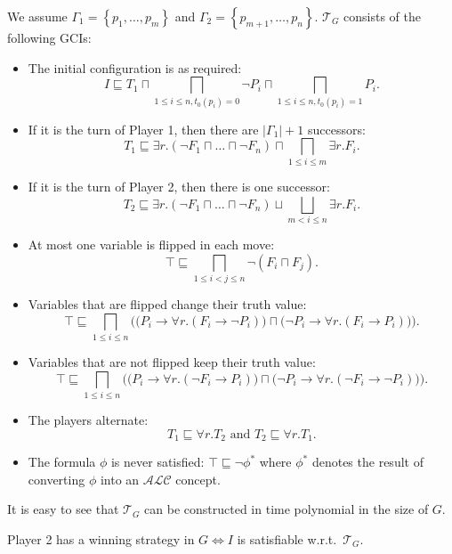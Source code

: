 We assume $\Gamma_1 = \left\{ p_1, \ldots, p_m \right\}$ and $\Gamma_2 = \left\{ p_{m+1}, \ldots, p_n \right\}$.
$\mathcal{T}_G$ consists of the following GCIs:
\begin{itemize}
	\item The initial configuration is as required:
		\[
			I \sqsubseteq T_1 \sqcap \bigsqcap_{1 \leq i \leq n ,t_0(p_i) = 0} \neg P_i \sqcap \bigsqcap_{1 \leq i \leq n, t_0(p_i) = 1} P_i
		.\]
	\item If it is the turn of Player 1, then there are $\lvert \Gamma_1 \rvert + 1$ successors:
		\[
			T_1 \sqsubseteq \exists r.(\neg F_1 \sqcap \ldots \sqcap \neg F_n) \sqcap \bigsqcap_{1 \leq i \leq m} \exists r.F_i
		.\]
	\item If it is the turn of Player 2, then there is one successor:
		\[
			T_2 \sqsubseteq \exists r.(\neg F_1 \sqcap \ldots \sqcap \neg F_n) \sqcup \bigsqcup_{m < i \leq n} \exists r.F_i
		.\]
	\item At most one variable is flipped in each move:
		\[
			\top \sqsubseteq \bigsqcap_{1 \leq i < j \leq n} \neg (F_i \sqcap F_j)
		.\]
	\item Variables that are flipped change their truth value:
		\[
			\top \sqsubseteq \bigsqcap_{1 \leq i \leq n} \bigg( \big( P_i \to \forall r.(F_i \to \neg P_i) \big) \sqcap \big( \neg P_i \to \forall r.(F_i \to P_i) \big) \bigg)
		.\]
	\item Variables that are not flipped keep their truth value:
		\[
			\top \sqsubseteq \bigsqcap_{1 \leq i \leq n} \bigg( \big( P_i \to \forall r.( \neg F_i \to P_i) \big) \sqcap \big( \neg P_i \to \forall r.(\neg F_i \to \neg P_i) \big) \bigg)
		.\]
		\item The players alternate:
			\[
			T_1 \sqsubseteq \forall r.T_2 \text{ and } T_2 \sqsubseteq \forall r.T_1
			.\]
		\item The formula $\phi$ is never satisfied: $\top \sqsubseteq \neg \phi^*$ 
			where $\phi^*$ denotes the result of converting $\phi$ into an  $\mathcal{ALC}$ concept.
\end{itemize}
It is easy to see that $\mathcal{T}_G$ can be constructed in time polynomial in the size of $G$.

\begin{lemma}
	Player 2 has a winning strategy in $G \iff I$ is satisfiable w.r.t.\ $\mathcal{T}_G$.
\end{lemma}
